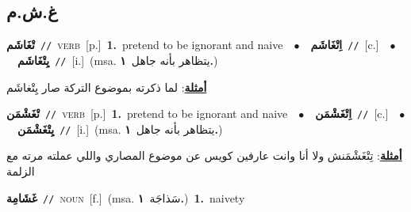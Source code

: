 \documentclass[10pt,a4paper,twoside]{article} %
\begin{document}
\begin{multicols}{2}
\vspace{-3mm}
\subsection*{\color{blue}\foreignlanguage{arabic}{غ.ش.م}\color{blue}{}} 

{\setlength\topsep{0pt}\textbf{\foreignlanguage{arabic}{تْغَاشَم}}\ {\color{gray}\texttt{//}\color{black}}\ \textsc{verb}\ [p.]\ \textbf{1.}~pretend to be ignorant and naive\ \ $\bullet$\ \ \setlength\topsep{0pt}\textbf{\foreignlanguage{arabic}{اِتْغَاشَم}}\ {\color{gray}\texttt{//}\color{black}}\ [c.]\ \ $\bullet$\ \ \setlength\topsep{0pt}\textbf{\foreignlanguage{arabic}{يِتْغَاشَم}}\ {\color{gray}\texttt{//}\color{black}}\ [i.]\ \color{gray}(msa. \foreignlanguage{arabic}{يتظاهر بأنه جاهل}~\foreignlanguage{arabic}{\textbf{١.}})\color{black}\  \begin{flushright}\color{gray}\foreignlanguage{arabic}{\textbf{\underline{\foreignlanguage{arabic}{أمثلة}}}: لما ذكرته بموضوع التركة صار يِتْغاشَم}\end{flushright}\color{black}} \vspace{2mm}

{\setlength\topsep{0pt}\textbf{\foreignlanguage{arabic}{تْغَشْمَن}}\ {\color{gray}\texttt{//}\color{black}}\ \textsc{verb}\ [p.]\ \textbf{1.}~pretend to be ignorant and naive\ \ $\bullet$\ \ \setlength\topsep{0pt}\textbf{\foreignlanguage{arabic}{اِتْغَشْمَن}}\ {\color{gray}\texttt{//}\color{black}}\ [c.]\ \ $\bullet$\ \ \setlength\topsep{0pt}\textbf{\foreignlanguage{arabic}{يِتْغَشْمَن}}\ {\color{gray}\texttt{//}\color{black}}\ [i.]\ \color{gray}(msa. \foreignlanguage{arabic}{يتظاهر بأنه جاهل}~\foreignlanguage{arabic}{\textbf{١.}})\color{black}\  \begin{flushright}\color{gray}\foreignlanguage{arabic}{\textbf{\underline{\foreignlanguage{arabic}{أمثلة}}}: تِتْغَشْمَنش ولا أنا وانت عارفين كويس عن موضوع المصاري واللي عملته مرته مع الزلمة}\end{flushright}\color{black}} \vspace{2mm}

{\setlength\topsep{0pt}\textbf{\foreignlanguage{arabic}{غَشَامِة}}\ {\color{gray}\texttt{//}\color{black}}\ \textsc{noun}\ [f.]\ \color{gray}(msa. \foreignlanguage{arabic}{سَذاجَة}~\foreignlanguage{arabic}{\textbf{١.}})\color{black}\ \textbf{1.}~naivety\ } \vspace{2mm}


\end{multicols}
\end{document}
